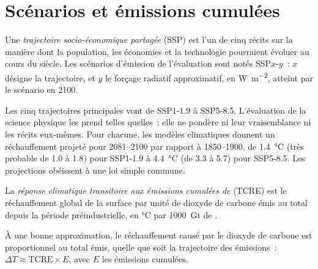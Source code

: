 \section{Scénarios et émissions cumulées}\label{sec:b2:anthropogenic-climate-change:scenarios}

\begin{definition}\label{def:b2:anthropogenic-climate-change:ssp}
Une \emph{trajectoire socio-économique partagée} (SSP) est
l'un de cinq récits sur la manière dont la population, les économies et la technologie pourraient évoluer
au cours du siècle. Les scénarios d'émission de l'évaluation sont notés SSP$x$-$y$~: $x$ désigne la
trajectoire, et $y$ le forçage radiatif approximatif, en \unit{W.m^{-2}}, atteint par le scénario en 2100.
\end{definition}

Les cinq trajectoires principales vont de SSP1-1.9 à SSP5-8.5. L'évaluation de la science physique
les prend telles quelles~: elle ne pondère ni leur vraisemblance ni les récits eux-mêmes. Pour
chacune, les modèles climatiques donnent un réchauffement projeté pour 2081--2100 par rapport à
1850--1900, de \qty{1.4}{\celsius} (très probable de 1.0 à 1.8) pour SSP1-1.9 à \qty{4.4}{\celsius}
(de 3.3 à 5.7) pour SSP5-8.5. Les projections obéissent à une loi simple commune.

\begin{definition}\label{def:b2:anthropogenic-climate-change:tcre}
La \emph{réponse climatique transitoire aux émissions cumulées de
} (TCRE)
est le réchauffement global de la surface par unité de dioxyde de carbone émis au total
depuis la période préindustrielle, en \unit{\celsius} par \qty{1000}{Gt} de .
\end{definition}

\begin{proposition}\label{prop:b2:anthropogenic-climate-change:tcre}
À une bonne approximation, le réchauffement causé par le dioxyde de carbone est
proportionnel au total émis, quelle que soit la trajectoire des émissions~:
$\Delta T \approx \text{TCRE} \times E$, avec $E$ les émissions cumulées.
\end{proposition}
\admitted

